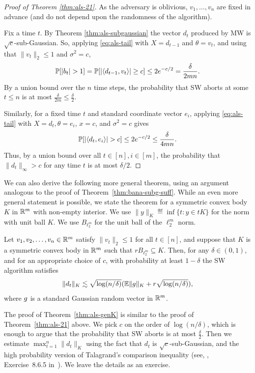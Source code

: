 \begin{proof}[Proof of Theorem \ref{thm:als-21}] 
As the adversary is oblivious, $v_1,\ldots,v_n$ are fixed in advance (and do not depend upon the randomness of the algorithm). 

Fix a time $t$.
By Theorem \ref{thm:als-subgaussian}
the vector $d_t$ produced by MW is $\sqrt{c}$-sub-Gaussian. So, applying \eqref{eq:als-tail} with $X=d_{t-1}$ and $\theta = v_t$, and using that $\|v_t\|_2\leq 1$ and $\sigma^2 =c$, 
\[\Pr[|b_t|>1] = \Pr[|\ip{d_{t-1},v_t}| \geq c] \leq 2 e^{-c/2} = \frac{\delta}{2mn}. \] 
By a union bound over the $n$ time steps, the probability that SW aborts at some $t\leq n$ is at most $\frac{\delta}{2m} \leq \frac{\delta}{2}$.

Similarly, for a fixed time $t$ and standard coordinate vector $e_i$, applying  \eqref{eq:als-tail} with $X=d_t, \theta = e_i$,  $x=c$, and $\sigma^2=c$ gives  \[\Pr[|\ip{ d_t,e_i}|> c] \leq 2 e^{-c/2} \leq \frac{\delta}{4mn}.\] Thus, by a union bound over all $t \in [n],i \in [m]$, the probability that $\|d_t\|_\infty >c$ for any time $t$ is at most $\delta/2$.
\end{proof}

\remark
We can also derive the following more general theorem, using an
argument analogous to the proof of
Theorem~\ref{thm:bana-subg-suff}. While an even more general statement
is possible, we state the theorem for a symmetric convex body $K$ in $\mathbb{R}^m$ with non-empty interior. We use
$\|y\|_K \eqdef \inf\{t: y \in tK\}$ for the norm with unit ball
$K$. We use $B_{\ell_2^m}$ for the unit ball of the $\ell_2^m$
norm.

\begin{theorem}\label{thm:als-genK}
  Let $v_1, v_2, \ldots, v_n \in \mathbb{R}^m$ satisfy $\|v_t\|_2 \leq 1$ for
  all $t \in [n]$, and suppose that $K$ is a symmetric convex  body in
  $\mathbb{R}^m$ such that $rB_{\ell_2^m} \subseteq K$. Then, for any $\delta
  \in (0,1)$, and for an appropriate choice of $c$, with probability at
  least $1-\delta$ the SW algorithm satisfies
  \[
    \|d_t\|_K \lesssim \sqrt{\log(n/\delta)}(\mathbb{E}\|g\|_K + r\sqrt{\log(n/\delta)}),
  \]
  where  $g$ is a standard Gaussian random vector in $\mathbb{R}^m$.
\end{theorem}

The proof of Theorem~\ref{thm:als-genK} is similar to the proof of
Theorem~\ref{thm:als-21} above. We pick $c$ on the order of
$\log(n/\delta)$, which is enough to argue that the probability that
SW aborts is at most $\frac{\delta}{2}$. Then we estimate $\max_{t =
  1}^n \|d_t\|_K$ using the fact that $d_t$ is $\sqrt{c}$-sub-Gaussian,
and the high probability version of Talagrand's comparison inequality
(see, \eg, Exercise~8.6.5 in~\cite{vershynin}). We leave the details
as an exercise.

